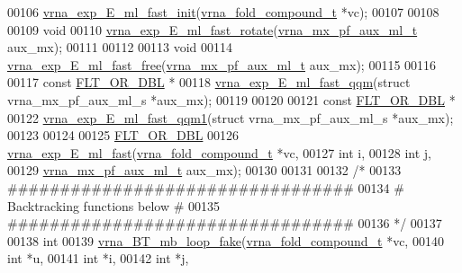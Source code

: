 \begin{DoxyCode}
00106 \mbox{\hyperlink{group__loops_gace7640e156900ba8b01edc1a7136b2b7}{vrna\_exp\_E\_ml\_fast\_init}}(\mbox{\hyperlink{group__fold__compound_structvrna__fc__s}{vrna\_fold\_compound\_t}} *vc);
00107 
00108 
00109 \textcolor{keywordtype}{void}
00110 \mbox{\hyperlink{group__loops_gabc73c029027ba09bfe70e2318052f0ae}{vrna\_exp\_E\_ml\_fast\_rotate}}(\mbox{\hyperlink{group__loops_ga39a8cc1385dcb542a60a9393cde6a1e3}{vrna\_mx\_pf\_aux\_ml\_t}} aux\_mx);
00111 
00112 
00113 \textcolor{keywordtype}{void}
00114 \mbox{\hyperlink{group__loops_ga3bbc24b3950867b039104ce8b4f39346}{vrna\_exp\_E\_ml\_fast\_free}}(\mbox{\hyperlink{group__loops_ga39a8cc1385dcb542a60a9393cde6a1e3}{vrna\_mx\_pf\_aux\_ml\_t}} aux\_mx);
00115 
00116 
00117 \textcolor{keyword}{const} \mbox{\hyperlink{group__data__structures_ga31125aeace516926bf7f251f759b6126}{FLT\_OR\_DBL}} *
00118 \mbox{\hyperlink{group__loops_gadb5ec8ebfe72254dace68f3693376643}{vrna\_exp\_E\_ml\_fast\_qqm}}(\textcolor{keyword}{struct} vrna\_mx\_pf\_aux\_ml\_s *aux\_mx);
00119 
00120 
00121 \textcolor{keyword}{const} \mbox{\hyperlink{group__data__structures_ga31125aeace516926bf7f251f759b6126}{FLT\_OR\_DBL}} *
00122 \mbox{\hyperlink{group__loops_ga38ecb773ebbc084d563339919152bcf7}{vrna\_exp\_E\_ml\_fast\_qqm1}}(\textcolor{keyword}{struct} vrna\_mx\_pf\_aux\_ml\_s *aux\_mx);
00123 
00124 
00125 \mbox{\hyperlink{group__data__structures_ga31125aeace516926bf7f251f759b6126}{FLT\_OR\_DBL}}
00126 \mbox{\hyperlink{group__loops_ga567d730fc5389b94d6ee545e42412d6c}{vrna\_exp\_E\_ml\_fast}}(\mbox{\hyperlink{group__fold__compound_structvrna__fc__s}{vrna\_fold\_compound\_t}} *vc,
00127                    \textcolor{keywordtype}{int}                  i,
00128                    \textcolor{keywordtype}{int}                  j,
00129                    \mbox{\hyperlink{group__loops_ga39a8cc1385dcb542a60a9393cde6a1e3}{vrna\_mx\_pf\_aux\_ml\_t}}  aux\_mx);
00130 
00131 
00132 \textcolor{comment}{/*}
00133 \textcolor{comment}{ #################################}
00134 \textcolor{comment}{ # Backtracking functions below  #}
00135 \textcolor{comment}{ #################################}
00136 \textcolor{comment}{ */}
00137 
00138 \textcolor{keywordtype}{int}
00139 \mbox{\hyperlink{group__loops_ga0272e774406ec70a97c231d03bef330b}{vrna\_BT\_mb\_loop\_fake}}(\mbox{\hyperlink{group__fold__compound_structvrna__fc__s}{vrna\_fold\_compound\_t}} *vc,
00140                      \textcolor{keywordtype}{int}                  *u,
00141                      \textcolor{keywordtype}{int}                  *i,
00142                      \textcolor{keywordtype}{int}                  *j,

\end{DoxyCode}
